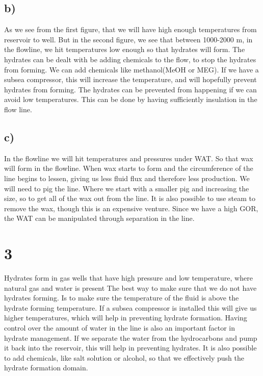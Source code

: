 \documentclass[DIV=calc, paper=a4, fontsize=13pt, twocolumn]{scrartcl}	 %
\begin{document}
\subsection*{b)}
As we see from the first figure, that we will have high enough temperatures from reservoir to well. But in the second figure, we see that between 1000-2000 m, in the flowline, we hit temperatures low enough so that hydrates will form. 
The hydrates can be dealt with be adding chemicals to the flow, to stop the hydrates from forming. We can add chemicals like methanol(MeOH or MEG). 
\newline
If we have a subsea compressor, this will increase the temperature, and will hopefully prevent hydrates from forming. 
\newline
The hydrates can be prevented from happening if we can avoid low temperatures. This can be done by having sufficiently insulation in the flow line.
\subsection*{c)}
In the flowline we will hit temperatures and pressures under WAT. So that wax will form in the flowline. When wax starts to form and the circumference of the line begins to lessen, giving us less fluid flux and therefore less production. We will need to pig the line. Where we start with a smaller pig and increasing the size, so to get all of the wax out from the line. It is also possible to use steam to remove the wax, though this is an expensive venture.
Since we have a high GOR, the WAT can be manipulated through separation in the line.
\section*{3}
Hydrates form in gas wells that have high pressure and low temperature, where natural gas and water is present
The best way to make sure that we do not have hydrates forming. Is to make sure the temperature of the fluid is above the hydrate forming temperature. If a subsea compressor is installed this will give us higher temperatures, which will help in preventing hydrate formation.
\newline
Having control over the amount of water in the line is also an important factor in hydrate management. If we separate the water from the hydrocarbons and pump it back into the reservoir, this will help in preventing hydrates.
\newline
It is also possible to add chemicals, like salt solution or alcohol, so that we effectively push the hydrate formation domain.
\end{document}
